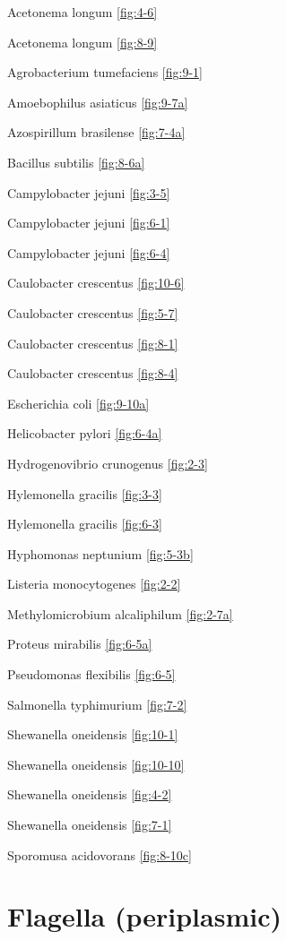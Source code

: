 \documentclass[]{tufte-book}
\begin{document}
Acetonema longum \ref{fig:4-6}

Acetonema longum \ref{fig:8-9}

Agrobacterium tumefaciens \ref{fig:9-1}

Amoebophilus asiaticus \ref{fig:9-7a}

Azospirillum brasilense \ref{fig:7-4a}

Bacillus subtilis \ref{fig:8-6a}

Campylobacter jejuni \ref{fig:3-5}

Campylobacter jejuni \ref{fig:6-1}

Campylobacter jejuni \ref{fig:6-4}

Caulobacter crescentus \ref{fig:10-6}

Caulobacter crescentus \ref{fig:5-7}

Caulobacter crescentus \ref{fig:8-1}

Caulobacter crescentus \ref{fig:8-4}

Escherichia coli \ref{fig:9-10a}

Helicobacter pylori \ref{fig:6-4a}

Hydrogenovibrio crunogenus \ref{fig:2-3}

Hylemonella gracilis \ref{fig:3-3}

Hylemonella gracilis \ref{fig:6-3}

Hyphomonas neptunium \ref{fig:5-3b}

Listeria monocytogenes \ref{fig:2-2}

Methylomicrobium alcaliphilum \ref{fig:2-7a}

Proteus mirabilis \ref{fig:6-5a}

Pseudomonas flexibilis \ref{fig:6-5}

Salmonella typhimurium \ref{fig:7-2}

Shewanella oneidensis \ref{fig:10-1}

Shewanella oneidensis \ref{fig:10-10}

Shewanella oneidensis \ref{fig:4-2}

Shewanella oneidensis \ref{fig:7-1}

Sporomusa acidovorans \ref{fig:8-10c}

\hypertarget{flagella-periplasmic}{%
\section*{Flagella (periplasmic)}\label{flagella-periplasmic}}
\end{document}
